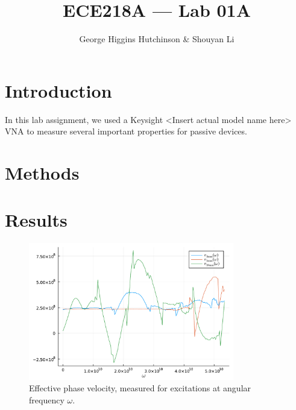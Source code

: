 \documentclass{article}
\title{ECE218A --- Lab 01A}
\author{George Higgins Hutchinson \& Shouyan Li}
\begin{document}
\maketitle

\section{Introduction}
In this lab assignment, we used a Keysight <Insert actual model name here> VNA to measure several important properties for passive devices.

\section{Methods}

\section{Results}
\begin{figure}
  \includegraphics[width=0.8\textwidth]{figures/build/phase_vel.pdf}
  \caption{Effective phase velocity, measured for excitations at angular frequency $\omega$.}
\end{figure}
\end{document}
